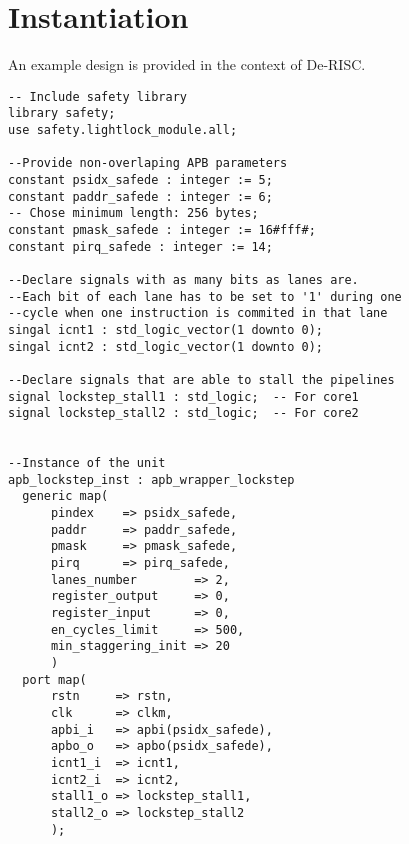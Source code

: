 \section{Instantiation}
An example design is provided in the context of De-RISC.
\\
\belowcaptionskip=-10pt
\begin{lstlisting}[label=ins-prot,caption=SafePMU instance example for gpp\_sys,style=vhdl]
-- Include safety library
library safety;
use safety.lightlock_module.all;

--Provide non-overlaping APB parameters
constant psidx_safede : integer := 5;
constant paddr_safede : integer := 6;
-- Chose minimum length: 256 bytes;
constant pmask_safede : integer := 16#fff#;  
constant pirq_safede : integer := 14;

--Declare signals with as many bits as lanes are.
--Each bit of each lane has to be set to '1' during one 
--cycle when one instruction is commited in that lane
singal icnt1 : std_logic_vector(1 downto 0);
singal icnt2 : std_logic_vector(1 downto 0);

--Declare signals that are able to stall the pipelines
signal lockstep_stall1 : std_logic;  -- For core1
signal lockstep_stall2 : std_logic;  -- For core2


--Instance of the unit
apb_lockstep_inst : apb_wrapper_lockstep
  generic map(
      pindex    => psidx_safede,
      paddr     => paddr_safede,            
      pmask     => pmask_safede,
      pirq      => pirq_safede,
      lanes_number        => 2,
      register_output     => 0,
      register_input      => 0,
      en_cycles_limit     => 500,
      min_staggering_init => 20
      )
  port map(
      rstn     => rstn,
      clk      => clkm,
      apbi_i   => apbi(psidx_safede),
      apbo_o   => apbo(psidx_safede),
      icnt1_i  => icnt1, 
      icnt2_i  => icnt2, 
      stall1_o => lockstep_stall1,
      stall2_o => lockstep_stall2
      );

\end{lstlisting}



